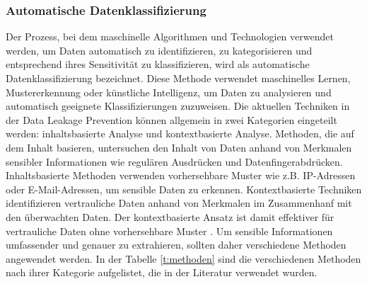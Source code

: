\subsubsection{Automatische Datenklassifizierung}
Der Prozess, bei dem maschinelle Algorithmen und Technologien verwendet werden, um Daten automatisch zu identifizieren, zu kategorisieren und entsprechend ihres Sensitivität zu klassifizieren, wird als automatische Datenklassifizierung bezeichnet. Diese Methode verwendet maschinelles Lernen, Mustererkennung oder künstliche Intelligenz, um Daten zu analysieren und automatisch geeignete Klassifizierungen zuzuweisen.
Die aktuellen Techniken in der Data Leakage Prevention können allgemein in zwei Kategorien eingeteilt werden: inhaltsbasierte Analyse und kontextbasierte Analyse. Methoden, die auf dem Inhalt basieren, untersuchen den Inhalt von Daten anhand von Merkmalen sensibler Informationen wie regulären Ausdrücken und Datenfingerabdrücken. Inhaltsbasierte Methoden verwenden vorhersehbare Muster wie z.B. IP-Adressen oder E-Mail-Adressen, um sensible Daten zu erkennen. Kontextbasierte Techniken identifizieren vertrauliche Daten anhand von Merkmalen im Zusammenhanf mit den überwachten Daten. Der kontextbasierte Ansatz ist damit effektiver für vertrauliche Daten ohne vorhersehbare Muster \cite{Guo.2021}\cite{Gugelmann.2015}\cite{Kuzina.2023}. Um sensible Informationen umfassender und genauer zu extrahieren, sollten daher verschiedene Methoden angewendet werden. In der Tabelle \ref{t:methoden} sind die verschiedenen Methoden nach ihrer Kategorie aufgelistet, die in der Literatur verwendet wurden.

